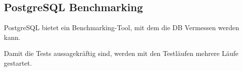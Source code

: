 
\begin{flushleft}
    \subsection{PostgreSQL Benchmarking}
    PostgreSQL bietet ein Benchmarking-Tool,\cite{TYJFF7AB,VXNYQFTE} mit dem die DB Vermessen werden kann.

    Damit die Tests aussagekräftig sind, werden mit den Testläufen mehrere Läufe gestartet.
\end{flushleft}